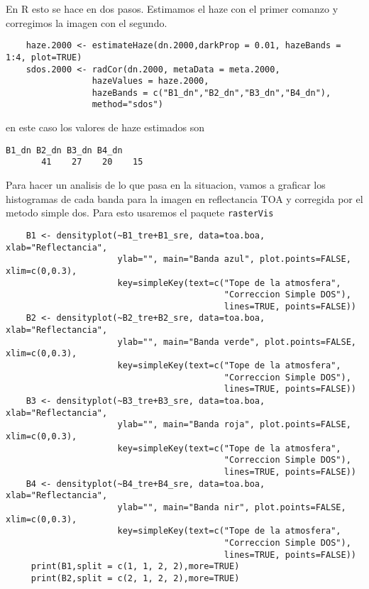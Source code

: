 \begin{exa}
    En R esto se hace en dos pasos. Estimamos el haze con el primer comanzo y
    corregimos la imagen con el segundo.
    \begin{lstlisting}
    haze.2000 <- estimateHaze(dn.2000,darkProp = 0.01, hazeBands = 1:4, plot=TRUE)
    sdos.2000 <- radCor(dn.2000, metaData = meta.2000, 
                 hazeValues = haze.2000,
                 hazeBands = c("B1_dn","B2_dn","B3_dn","B4_dn"), 
                 method="sdos")
    \end{lstlisting}
    en este caso los valores de haze estimados son
    \begin{Verbatim}[fontsize=\small]
    B1_dn B2_dn B3_dn B4_dn 
       41    27    20    15 
    \end{Verbatim}
    Para hacer un analisis de lo que pasa en la situacion, vamos a graficar los
    histogramas de cada banda para la imagen en reflectancia TOA y corregida por
    el metodo simple dos. Para esto usaremos el paquete \texttt{rasterVis}
    \begin{lstlisting}
    B1 <- densityplot(~B1_tre+B1_sre, data=toa.boa, xlab="Reflectancia",
                      ylab="", main="Banda azul", plot.points=FALSE, xlim=c(0,0.3),
                      key=simpleKey(text=c("Tope de la atmosfera",
                                           "Correccion Simple DOS"),
                                           lines=TRUE, points=FALSE))    
    B2 <- densityplot(~B2_tre+B2_sre, data=toa.boa, xlab="Reflectancia",
                      ylab="", main="Banda verde", plot.points=FALSE, xlim=c(0,0.3),
                      key=simpleKey(text=c("Tope de la atmosfera",
                                           "Correccion Simple DOS"),
                                           lines=TRUE, points=FALSE))    
    B3 <- densityplot(~B3_tre+B3_sre, data=toa.boa, xlab="Reflectancia",
                      ylab="", main="Banda roja", plot.points=FALSE, xlim=c(0,0.3),
                      key=simpleKey(text=c("Tope de la atmosfera",
                                           "Correccion Simple DOS"),
                                           lines=TRUE, points=FALSE))    
    B4 <- densityplot(~B4_tre+B4_sre, data=toa.boa, xlab="Reflectancia",
                      ylab="", main="Banda nir", plot.points=FALSE, xlim=c(0,0.3),
                      key=simpleKey(text=c("Tope de la atmosfera",
                                           "Correccion Simple DOS"),
                                           lines=TRUE, points=FALSE))    
     print(B1,split = c(1, 1, 2, 2),more=TRUE)
     print(B2,split = c(2, 1, 2, 2),more=TRUE)

\end{lstlisting}
\end{exa}
